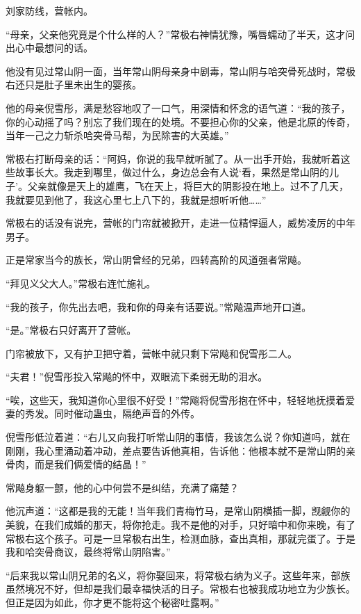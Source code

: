
\begin{this_body}

刘家防线，营帐内。

“母亲，父亲他究竟是个什么样的人？”常极右神情犹豫，嘴唇蠕动了半天，这才问出心中最想问的话。

他没有见过常山阴一面，当年常山阴母亲身中剧毒，常山阴与哈突骨死战时，常极右还只是肚子里未出生的婴孩。

他的母亲倪雪彤，满是愁容地叹了一口气，用深情和怀念的语气道：“我的孩子，你的心动摇了吗？别忘了我们现在的处境。不要担心你的父亲，他是北原的传奇，当年一己之力斩杀哈突骨马帮，为民除害的大英雄。”

常极右打断母亲的话：“阿妈，你说的我早就听腻了。从一出手开始，我就听着这些故事长大。我走到哪里，做过什么，身边总会有人说‘看，果然是常山阴的儿子’。父亲就像是天上的雄鹰，飞在天上，将巨大的阴影投在地上。过不了几天，我就要见到他了，我这心里七上八下的，我就是想听听他……”

常极右的话没有说完，营帐的门帘就被掀开，走进一位精悍逼人，威势凌厉的中年男子。

正是常家当今的族长，常山阴曾经的兄弟，四转高阶的风道强者常飚。

“拜见义父大人。”常极右连忙施礼。

“我的孩子，你先出去吧，我和你的母亲有话要说。”常飚温声地开口道。

“是。”常极右只好离开了营帐。

门帘被放下，又有护卫把守着，营帐中就只剩下常飚和倪雪彤二人。

“夫君！”倪雪彤投入常飚的怀中，双眼流下柔弱无助的泪水。

“唉，这些天，我知道你心里很不好受！”常飚将倪雪彤抱在怀中，轻轻地抚摸着爱妻的秀发。同时催动蛊虫，隔绝声音的外传。

倪雪彤低泣着道：“右儿又向我打听常山阴的事情，我该怎么说？你知道吗，就在刚刚，我心里涌动着冲动，差点要告诉他真相，告诉他：他根本就不是常山阴的亲骨肉，而是我们俩爱情的结晶！”

常飚身躯一颤，他的心中何尝不是纠结，充满了痛楚？

他沉声道：“这都是我的无能！当年我们青梅竹马，是常山阴横插一脚，觊觎你的美貌，在我们成婚的那天，将你抢走。我不是他的对手，只好暗中和你来晚，有了常极右这个孩子。可是一旦常极右出生，检测血脉，查出真相，那就完蛋了。于是我和哈突骨商议，最终将常山阴陷害。”

“后来我以常山阴兄弟的名义，将你娶回来，将常极右纳为义子。这些年来，部族虽然境况不好，但却是我们最幸福快活的日子。常极右也被我成功地立为少族长。但正是因为如此，你才更不能将这个秘密吐露啊。”


\end{this_body}
